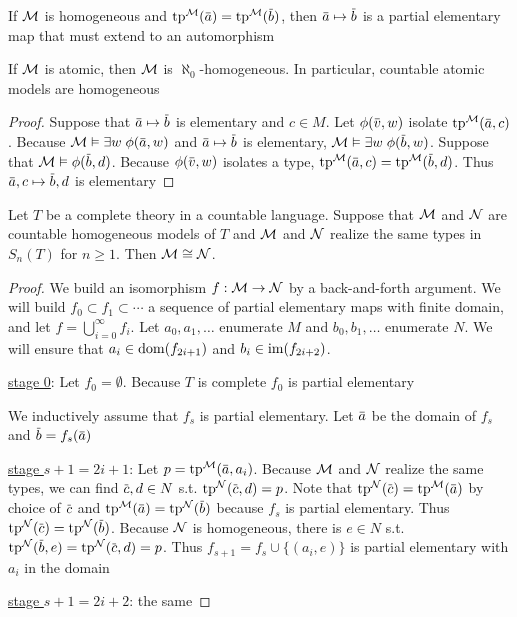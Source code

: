 \documentclass[11pt]{article}
\begin{document}
If \(\mathcal{M}\) is homogeneous and \(\tp^{\calm}(\bara)=\tp^{\calm}(\barb)\), then \(\bara\mapsto\barb\) is a partial
elementary map that must extend to an automorphism

\begin{lemma}[]
\label{lemma4.2.14}
If \(\mathcal{M}\) is atomic, then \(\mathcal{M}\) is \(\aleph_0\)-homogeneous. In particular, countable atomic models
are homogeneous
\end{lemma}

\begin{proof}
Suppose that \(\bara\mapsto\barb\) is elementary and \(c\in M\). Let \(\phi(\barv,w)\)
isolate \(\tp^{\calm}(\bara,c)\). Because \(\calm\vDash\exists w\;\phi(\bara,w)\) and \(\bara\mapsto\barb\) is
elementary, \(\calm\vDash\exists w\;\phi(\barb,w)\). Suppose that \(\calm\vDash\phi(\barb,d)\). Because \(\phi(\barv,w)\)
isolates a type, \(\tp^{\calm}(\bara,c)=\tp^{\calm}(\barb,d)\). Thus \(\bara,c\mapsto\barb,d\) is elementary
\end{proof}

\begin{theorem}[]
\label{thm4.2.15}
Let \(T\) be a complete theory in a countable language. Suppose that \(\mathcal{M}\) and \(\mathcal{N}\) are
countable homogeneous models of \(T\) and \(\mathcal{M}\) and \(\mathcal{N}\) realize the same types in \(S_n(T)\)
for \(n\ge 1\). Then \(\mathcal{M}\cong\mathcal{N}\).
\end{theorem}

\begin{proof}
We build an isomorphism \(f:\mathcal{M}\to\mathcal{N}\) by a back-and-forth argument. We will build \(f_0\subset f_1\subset\cdots\) a
sequence of partial elementary maps with finite domain, and let \(f=\bigcup_{i=0}^\infty f_i\).
Let \(a_0,a_1,\dots\) enumerate \(M\) and \(b_0,b_1,\dots\) enumerate \(N\). We will ensure
that \(a_i\in\operatorname{dom}(f_{2i+1})\) and \(b_i\in\operatorname{im}(f_{2i+2})\).

\uline{stage 0}: Let \(f_0=\emptyset\). Because \(T\) is complete \(f_0\) is partial elementary

We inductively assume that \(f_s\) is partial elementary. Let \(\bara\) be the domain of \(f_s\)
and \(\barb=f_s(\bara)\)

\uline{stage \(s+1=2i+1\)}: Let \(p=\tp^{\calm}(\bara,a_i)\). Because \(\mathcal{M}\) and \(\mathcal{N}\) realize the same types,
we can find \(\barc,d\in N\) s.t. \(\tp^{\caln}(\barc,d)=p\). Note
that \(\tp^{\caln}(\barc)=\tp^{\calm}(\bara)\) by choice of \(\barc\)
and \(\tp^{\calm}(\bara)=\tp^{\caln}(\barb)\) because \(f_s\) is partial elementary.
Thus \(\tp^{\caln}(\barc)=\tp^{\caln}(\barb)\). Because \(\mathcal{N}\) is homogeneous, there is \(e\in N\) s.t.
\(\tp^{\caln}(\barb,e)=\tp^{\caln}(\barc,d)=p\). Thus \(f_{s+1}=f_s\cup\{(a_i,e)\}\) is partial elementary
with \(a_i\) in the domain

\uline{stage \(s+1=2i+2\)}: the same
\end{proof}
\end{document}
